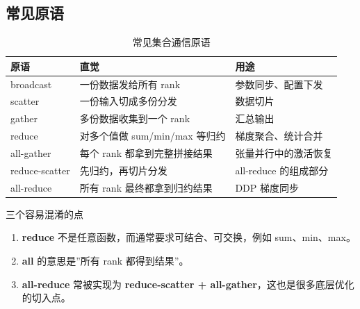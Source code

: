 \documentclass[a4paper]{article}
\begin{document}
\subsection{常见原语}

\begin{table}[H]
\centering
\small
\begin{tabular}{lll}
\toprule
\textbf{原语} & \textbf{直觉} & \textbf{用途} \\
\midrule
broadcast & 一份数据发给所有 rank & 参数同步、配置下发 \\
scatter & 一份输入切成多份分发 & 数据切片 \\
gather & 多份数据收集到一个 rank & 汇总输出 \\
reduce & 对多个值做 sum/min/max 等归约 & 梯度聚合、统计合并 \\
all-gather & 每个 rank 都拿到完整拼接结果 & 张量并行中的激活恢复 \\
reduce-scatter & 先归约，再切片分发 & all-reduce 的组成部分 \\
all-reduce & 所有 rank 最终都拿到归约结果 & DDP 梯度同步 \\
\bottomrule
\end{tabular}
\caption{常见集合通信原语}
\end{table}

\begin{importantbox}{三个容易混淆的点}
\begin{enumerate}
    \item \textbf{reduce} 不是任意函数，而通常要求可结合、可交换，例如 sum、min、max。
    \item \textbf{all} 的意思是”所有 rank 都得到结果”。
    \item \textbf{all-reduce} 常被实现为 \textbf{reduce-scatter + all-gather}，这也是很多底层优化的切入点。
\end{enumerate}
\end{importantbox}
\end{document}
